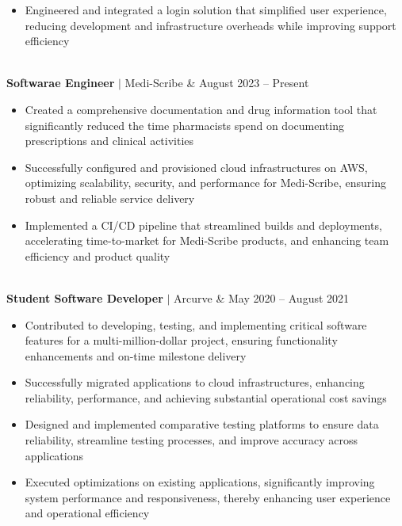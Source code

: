 \documentclass[11pt]{article}
\newenvironment{compactList}
{
  \begin{itemize}
    \setlength{\itemsep}{0pt}
    \setlength{\parskip}{0pt}
}
{\end{itemize}}
\begin{document}
\begin{tabularx}{\textwidth\setlength{\extrarowheight}{5pt}}
{\begin{minipage}{0.85\paperwidth}
\begin{compactList}
        \item Engineered and integrated a login solution that simplified user experience, reducing development and infrastructure overheads while improving support efficiency
      \end{compactList}
    \end{minipage}
  }
  \\
  \textbf{Softwarae Engineer} $\vert$ Medi-Scribe               & August 2023 – Present \\
  {
    \begin{minipage}{0.85\paperwidth}
      \begin{compactList}
        \item Created a comprehensive documentation and drug information tool that significantly reduced the time pharmacists spend on documenting prescriptions and clinical activities
        \item Successfully configured and provisioned cloud infrastructures on AWS, optimizing scalability, security, and performance for Medi-Scribe, ensuring robust and reliable service delivery
        \item Implemented a CI/CD pipeline that streamlined builds and deployments, accelerating time-to-market for Medi-Scribe products, and enhancing team efficiency and product quality
      \end{compactList}
    \end{minipage}
  }
  \\
  \textbf{Student Software Developer} $\vert$ Arcurve                     & May 2020 – August 2021 \\
  {
    \begin{minipage}{0.85\paperwidth}
      \begin{compactList}
        \item Contributed to developing, testing, and implementing critical software features for a multi-million-dollar project, ensuring functionality enhancements and on-time milestone delivery
        \item Successfully migrated applications to cloud infrastructures, enhancing reliability, performance, and achieving substantial operational cost savings
        \item Designed and implemented comparative testing platforms to ensure data reliability, streamline testing processes, and improve accuracy across applications
        \item Executed optimizations on existing applications, significantly improving system performance and responsiveness, thereby enhancing user experience and operational efficiency
      \end{compactList}
    \end{minipage}
  }
\end{tabularx}
\vspace{-10pt}
\end{document}

